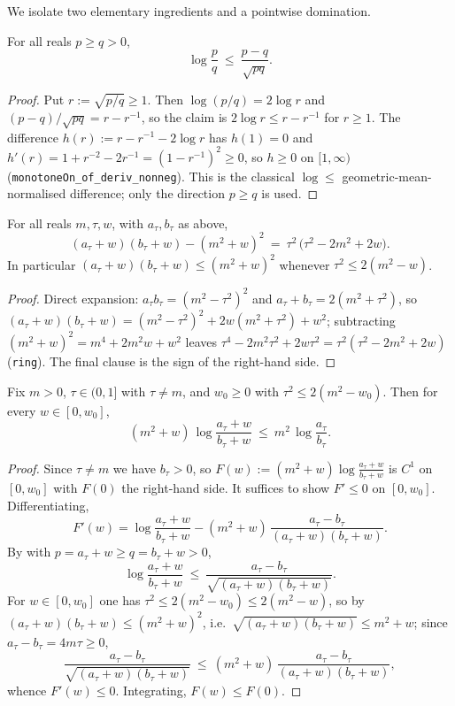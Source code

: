 We isolate two elementary ingredients and a pointwise domination.

\begin{lemma}
\label{lem:ls_r2_amgm}
For all reals $p\ge q>0$,
\[
  \log\frac pq\ \le\ \frac{p-q}{\sqrt{pq}}.
\]
\end{lemma}

\begin{proof}
Put $r:=\sqrt{p/q}\ge1$. Then $\log(p/q)=2\log r$ and
$(p-q)/\sqrt{pq}=r-r^{-1}$, so the claim is $2\log r\le r-r^{-1}$ for $r\ge1$. The
difference $h(r):=r-r^{-1}-2\log r$ has $h(1)=0$ and
$h'(r)=1+r^{-2}-2r^{-1}=(1-r^{-1})^2\ge0$, so $h\ge0$ on $[1,\infty)$
(\texttt{monotoneOn\_of\_deriv\_nonneg}). This is the classical
$\log\le$ geometric-mean-normalised difference; only the direction $p\ge q$ is used.
\end{proof}

\begin{lemma}
\label{lem:ls_r2_algebra}
For all reals $m,\tau,w$, with $a_\tau,b_\tau$ as above,
\[
  (a_\tau+w)(b_\tau+w)-(m^2+w)^2\ =\ \tau^2\,\bigl(\tau^2-2m^2+2w\bigr).
\]
In particular $(a_\tau+w)(b_\tau+w)\le(m^2+w)^2$ whenever $\tau^2\le2(m^2-w)$.
\end{lemma}

\begin{proof}
Direct expansion: $a_\tau b_\tau=(m^2-\tau^2)^2$ and $a_\tau+b_\tau=2(m^2+\tau^2)$, so
$(a_\tau+w)(b_\tau+w)=(m^2-\tau^2)^2+2w(m^2+\tau^2)+w^2$; subtracting
$(m^2+w)^2=m^4+2m^2w+w^2$ leaves $\tau^4-2m^2\tau^2+2w\tau^2=\tau^2(\tau^2-2m^2+2w)$
(\texttt{ring}). The final clause is the sign of the right-hand side.
\end{proof}

\begin{lemma}
\label{lem:ls_r2_pointwise}
Fix $m>0$, $\tau\in(0,1]$ with $\tau\neq m$, and $w_0\ge0$ with
$\tau^2\le2(m^2-w_0)$. Then for every $w\in[0,w_0]$,
\[
  (m^2+w)\,\log\frac{a_\tau+w}{b_\tau+w}\ \le\ m^2\,\log\frac{a_\tau}{b_\tau}.
\]
\end{lemma}

\begin{proof}
Since $\tau\neq m$ we have $b_\tau>0$, so
$F(w):=(m^2+w)\log\frac{a_\tau+w}{b_\tau+w}$ is $C^1$ on $[0,w_0]$ with $F(0)$ the
right-hand side. It suffices to show $F'\le0$ on $[0,w_0]$. Differentiating,
\[
  F'(w)=\log\frac{a_\tau+w}{b_\tau+w}
        -(m^2+w)\,\frac{a_\tau-b_\tau}{(a_\tau+w)(b_\tau+w)} .
\]
By  with $p=a_\tau+w\ge q=b_\tau+w>0$,
\[
  \log\frac{a_\tau+w}{b_\tau+w}\ \le\ \frac{a_\tau-b_\tau}{\sqrt{(a_\tau+w)(b_\tau+w)}} .
\]
For $w\in[0,w_0]$ one has $\tau^2\le2(m^2-w_0)\le2(m^2-w)$, so by
 $(a_\tau+w)(b_\tau+w)\le(m^2+w)^2$, i.e.\
$\sqrt{(a_\tau+w)(b_\tau+w)}\le m^2+w$; since $a_\tau-b_\tau=4m\tau\ge0$,
\[
  \frac{a_\tau-b_\tau}{\sqrt{(a_\tau+w)(b_\tau+w)}}
  \ \le\ (m^2+w)\,\frac{a_\tau-b_\tau}{(a_\tau+w)(b_\tau+w)} ,
\]
whence $F'(w)\le0$. Integrating, $F(w)\le F(0)$.
\end{proof}

